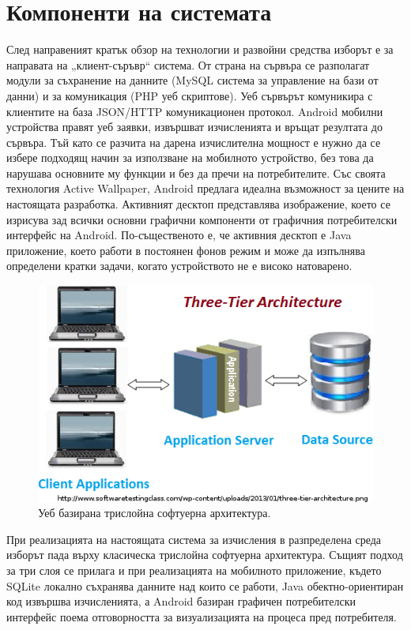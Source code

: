 \documentclass[book,14pt,oneside,openany]{memoir}
\begin{document}
\section{Компоненти на системата}

След направеният кратък обзор на технологии и развойни средства изборът е за направата на „клиент-съръвр“ система. От страна на сървъра се разполагат модули за съхранение на данните (MySQL система за управление на бази от данни) и за комуникация (PHP уеб скриптове). Уеб сървърът комуникира с клиентите на база JSON/HTTP комуникационен протокол. Android мобилни устройства правят уеб заявки, извършват изчисленията и връщат резултата до сървъра. Тъй като се разчита на дарена изчислителна мощност е нужно да се избере подходящ начин за използване на мобилното устройство, без това да нарушава основните му функции и без да пречи на потребителите. Със своята технология Active Wallpaper, Android предлага идеална възможност за цените на настоящата разработка. Активният десктоп представлява изображение, което се изрисува зад всички основни графични компоненти от графичния потребителски интерфейс на Android. По-същественото е, че активния десктоп е Java приложение, което работи в постоянен фонов режим и може да изпълнява определени кратки задачи, когато устройството не е високо натоварено. 

\begin{figure}[h!]
  \centering
  \includegraphics[height=0.25\pdfpageheight]{./images/pic0008.png}
  \caption{Уеб базирана трислойна софтуерна архитектура.}
\label{fig:pic0008}
\end{figure}

При реализацията на настоящата система за изчисления в разпределена среда изборът пада върху класическа трислойна софтуерна архитектура. Същият подход за три слоя се прилага и при реализацията на мобилното приложение, където SQLite локално съхранява данните над които се работи, Java обектно-ориентиран код извършва изчисленията, а Android базиран графичен потребителски интерфейс поема отговорността за визуализацията на процеса пред потребителя. 
\end{document}
